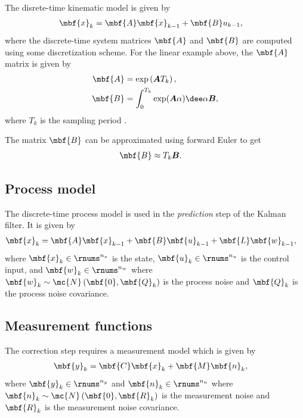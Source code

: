 \documentclass[nobib]{tufte-handout}
\begin{document}
    The disrete-time kinematic model is given by
    \begin{align}
        \mbf{x}_{k} &= \mbf{A}\mbf{x}_{k-1} + \mbf{B}u_{k-1},        
    \end{align}
    where the discrete-time system matrices $\mbf{A}$ and $\mbf{B}$ are computed using some discretization scheme. For the linear example above, the $\mbf{A}$ matrix is given by
    \begin{align}
        \mbf{A} &= \exp\left( \boldsymbol{A} T_{k} \right),\\
        \mbf{B} &= \int_{0}^{T_{k}}\exp(\boldsymbol{A}\alpha)\dee\alpha \boldsymbol{B},
    \end{align}
    where $T_{k}$ is the sampling period \cite{Farrell_Aided_2008}.
     
    The matrix $\mbf{B}$ can be approximated using forward Euler to get
    \begin{align}
        \mbf{B} &\approx T_{k}\boldsymbol{B}.
    \end{align}

    \subsection{Process model}
    The discrete-time process model is used in the \emph{prediction} step of the Kalman filter. It is given by
    \begin{align}
        \label{eq:DT linear process model}
        \mbf{x}_{k} &= \mbf{A}\mbf{x}_{k-1} + \mbf{B}\mbf{u}_{k-1} + \mbf{L}\mbf{w}_{k-1},
    \end{align}
    where $\mbf{x}_{k}\in\rnums^{n_{x}}$ is the state, $\mbf{u}_{k}\in\rnums^{n_{u}}$ is the control input, and $\mbf{w}_{k}\in\rnums^{n_{w}}$ where $\mbf{w}_{k}\sim\mc{N}\left( \mbf{0}, \mbf{Q}_{k} \right)$ is the process noise and $\mbf{Q}_{k}$ is the process noise covariance. 

    \subsection{Measurement functions}
    The correction step requires a measurement model which is given by
    \begin{align}
        \mbf{y}_{k} &= \mbf{C}\mbf{x}_{k} + \mbf{M}\mbf{n}_{k},
    \end{align}
    where $\mbf{y}_{k}\in\rnums^{n_{y}}$ and $\mbf{n}_{k}\in\rnums^{n_{n}}$ where $\mbf{n}_{k}\sim\mc{N}\left( \mbf{0}, \mbf{R}_{k} \right)$ is the measurement noise and $\mbf{R}_{k}$ is the measurement noise covariance.
\end{document}
